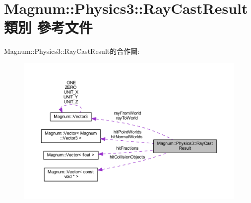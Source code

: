 \hypertarget{class_magnum_1_1_physics3_1_1_ray_cast_result}{}\section{Magnum\+:\+:Physics3\+:\+:Ray\+Cast\+Result 類別 參考文件}
\label{class_magnum_1_1_physics3_1_1_ray_cast_result}


Magnum\+:\+:Physics3\+:\+:Ray\+Cast\+Result的合作圖\+:\nopagebreak
\begin{figure}[H]
\begin{center}
\leavevmode
\includegraphics[width=350pt]{class_magnum_1_1_physics3_1_1_ray_cast_result__coll__graph}
\end{center}
\end{figure}

